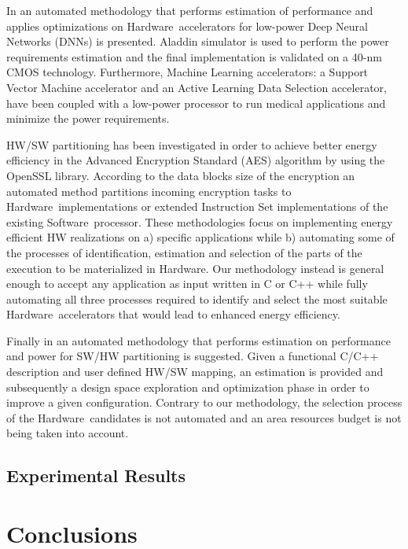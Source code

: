 \documentclass[]{usiinfthesis}
\newcommand{\HW}{{Hardware}}
\newcommand{\SW}{{Software}}
\begin{document}
In \cite{ReagenJun16} an automated methodology that performs estimation of performance and 
applies optimizations on \HW\ accelerators for low-power Deep Neural Networks (DNNs) is presented. 
Aladdin simulator \cite{ShaoJul14} is used to perform the power requirements estimation and the 
final implementation is validated on a 40-nm CMOS technology. Furthermore, Machine Learning 
accelerators: a Support Vector Machine accelerator and an Active Learning Data Selection 
accelerator, have been coupled with a low-power processor \cite{LeeApr13} to run medical
applications and minimize the power requirements.\par

HW/SW partitioning has been investigated \cite{XiaoMay18} in order to achieve better 
energy efficiency in the Advanced Encryption Standard (AES) algorithm by using the OpenSSL 
\cite{OpensslDec98} library. According to the data blocks size of the encryption an automated 
method partitions incoming encryption tasks to \HW\ implementations or extended Instruction Set 
implementations of the existing \SW\ processor. These methodologies focus on implementing 
energy efficient HW realizations on a) specific applications while b) automating some of the 
processes of identification, estimation and selection of the parts of the execution to be 
materialized in \HW. Our methodology instead is general enough to accept any application as 
input written in C or C++ while fully automating all three processes required to identify and 
select the most suitable \HW\ accelerators that would lead to enhanced energy efficiency.\par

Finally in \cite{GruttnerNov13} an automated methodology that performs estimation on performance 
and power for SW/HW partitioning is suggested. Given a functional C/C++ description and user 
defined HW/SW mapping, an estimation is provided and subsequently a design space exploration 
and optimization phase in order to improve a given configuration. Contrary to our methodology, 
the selection process of the \HW\ candidates is not automated and an area resources budget is 
not being taken into account. 

\subsection{Experimental Results}
\label{sec:results_es}

\section{Conclusions}
\end{document}
